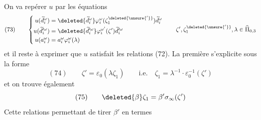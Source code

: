 On va repérer $u$ par les équations
\[
(73)\qquad\left\{\begin{aligned}
u(\widetilde d_i^\omega)&=\deleted{\widetilde d_i^\omega}\varphi_i^\omega(\zeta_1^{\deleted{\unsure{'}}})\widetilde d_i^\omega\\
u(\widetilde d_i^{\prime\omega})&=\deleted{\widetilde d_i^{\prime\omega}}\varphi_i^{\omega'}(\zeta')\widetilde d_i^{\prime\omega}\\
u(a_i^\omega)&=a_i^\omega\varphi_i^\omega(\lambda)
\end{aligned}\right.\qquad \zeta',\zeta_1^{\deleted{\unsure{'}}},\lambda\in\widehat\Pi_{0,3}
\]
et il reste à exprimer que $u$ satisfait les relations (72). La première s'explicite sous la forme
\[
(74)\qquad\zeta'=\varepsilon_0(\lambda\zeta_1)\qquad\text{i.e.}\quad\zeta_1=\lambda^{-1}\cdot\varepsilon_0^{-1}(\zeta')
\]
et on trouve également
\[
(75)\qquad\deleted{\beta}\zeta_1=\beta'\sigma_\infty(\zeta')
\]
Cette relations permettant de tirer $\beta'$ en termes
